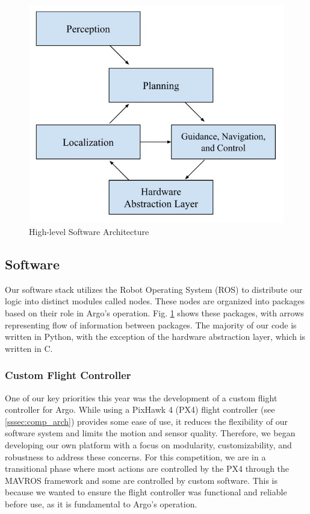 \documentclass[conference]{IEEEtran}
\begin{document}
\begin{figure}[htbp]
    \centerline{\includegraphics[scale=0.5]{images/ros_diagram.jpg}}
    \caption{High-level Software Architecture}
    \label{fig:ros}
\end{figure}
\subsection{Software}
\label{ssec:software}
Our software stack utilizes the Robot Operating System (ROS) to distribute our logic into distinct modules called nodes. These nodes are organized into packages based on their role in Argo's operation. Fig. \ref{fig:ros} shows these packages, with arrows representing flow of information between packages. The majority of our code is written in Python, with the exception of the hardware abstraction layer, which is written in C. 

\subsubsection{Custom Flight Controller}
\label{sssec:custom_flight_controller}
One of our key priorities this year was the development of a custom flight controller for Argo. While using a PixHawk 4 (PX4) flight controller (see \ref{sssec:comp_arch}) provides some ease of use, it reduces the flexibility of our software system and limits the motion and sensor quality. Therefore, we began developing our own platform with a focus on modularity, customizability, and robustness to address these concerns. For this competition, we are in a transitional phase where most actions are controlled by the PX4 through the MAVROS framework and some are controlled by custom software. This is because we wanted to ensure the flight controller was functional and reliable before use, as it is fundamental to Argo's operation.
\end{document}
